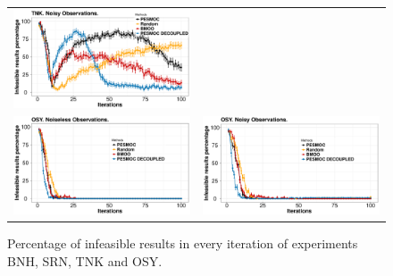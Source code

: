 \documentclass[review,preprint,12pt]{elsarticle}
\begin{document}
\begin{figure}[htb]
\begin{tabular}{cc}
                \includegraphics[width=0.475\linewidth]{../figures/benchmark/TNK_zeros_noisy} \\
                \includegraphics[width=0.475\linewidth]{../figures/benchmark/OSY_zeros_noiseless} &
                \includegraphics[width=0.475\linewidth]{../figures/benchmark/OSY_zeros_noisy} \\
        \end{tabular}
        \caption{Percentage of infeasible results in every iteration of experiments BNH, SRN, TNK and OSY.}
        \label{fig:benchmark_results_3}
\end{figure}
\end{document}
